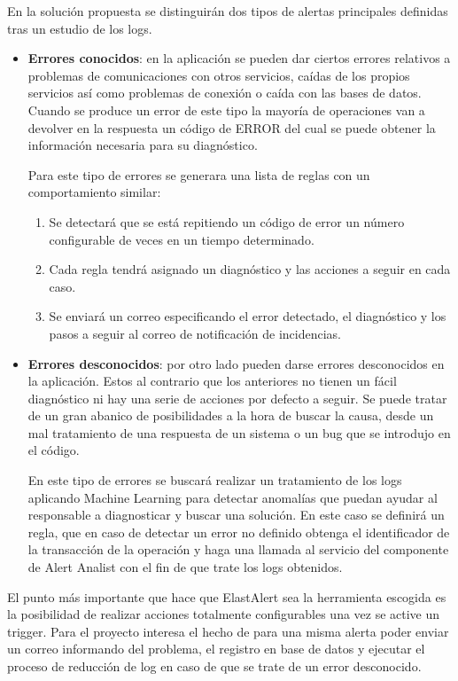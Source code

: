 En la solución propuesta se distinguirán dos tipos de alertas principales definidas tras un estudio de los logs.

\begin{itemize}
    \item \textbf{Errores conocidos}: en la aplicación se pueden dar ciertos errores relativos a problemas de comunicaciones con otros servicios, caídas de los propios servicios así como problemas de conexión o caída con las bases de datos. Cuando se produce un error de este tipo la mayoría de operaciones van a devolver en la respuesta un código de ERROR del cual se puede obtener la información necesaria para su diagnóstico.
    
    Para este tipo de errores se generara una lista de reglas con un comportamiento similar:
    \begin{enumerate}
        \item Se detectará que se está repitiendo un código de error un número configurable de veces en un tiempo determinado.
        \item Cada regla tendrá asignado un diagnóstico y las acciones a seguir en cada caso.
        \item Se enviará un correo especificando el error detectado, el diagnóstico y los pasos a seguir al correo de notificación de incidencias.
        
    \end{enumerate}
    
    \item \textbf{Errores desconocidos}: por otro lado pueden darse errores desconocidos en la aplicación. Estos al contrario que los anteriores no tienen un fácil diagnóstico ni hay una serie de acciones por defecto a seguir. Se puede tratar de un gran abanico de posibilidades a la hora de buscar la causa, desde un mal tratamiento de una respuesta de un sistema o un bug que se introdujo en el código. 
    
    En este tipo de errores se buscará realizar un tratamiento de los logs aplicando Machine Learning para detectar anomalías que puedan ayudar al responsable a diagnosticar y buscar una solución. En este caso se definirá un regla, que en caso de detectar un error no definido obtenga el identificador de la transacción de la operación y haga una llamada al servicio del componente de Alert Analist con el fin de que trate los logs obtenidos.
    
\end{itemize}

El punto más importante que hace que ElastAlert sea la herramienta escogida es la posibilidad de realizar acciones totalmente configurables una vez se active un trigger. Para el proyecto interesa el hecho de para una misma alerta poder enviar un correo informando del problema, el registro en base de datos y ejecutar el proceso de reducción de log en caso de que se trate de un error desconocido.


